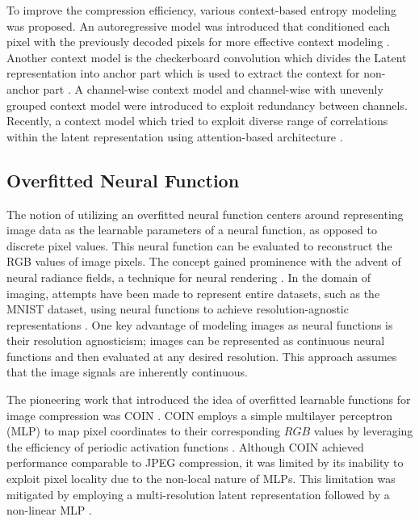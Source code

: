To improve the compression efficiency, various context-based entropy modeling was proposed. An autoregressive model was introduced that conditioned each pixel with the previously decoded pixels for more effective context modeling \cite{minnenJointAutoregressiveHierarchical2018}. Another context model is the checkerboard convolution which divides the Latent representation into anchor part which is used to extract the context for non-anchor part \cite{chengLearnedImageCompression2020}.  A channel-wise context model \cite{liuUnifiedEndtoEndFramework2020} and channel-wise with unevenly grouped context model \cite{heELICEfficientLearned2022} were introduced to exploit redundancy between channels. Recently, a context model which tried to exploit diverse range of correlations within the latent representation using attention-based architecture \cite{jiangMLICMultiReferenceEntropy2024,jiangMLICLinearComplexity2024}. 

\subsection{Overfitted Neural Function}\label{sec:Overfitted_Neural_Function}

The notion of utilizing an overfitted neural function centers around representing image data as the learnable parameters of a neural function, as opposed to discrete pixel values. This neural function can be evaluated to reconstruct the RGB values of image pixels. The concept gained prominence with the advent of neural radiance fields, a technique for neural rendering \cite{mildenhallNeRFRepresentingScenes2020, mullerInstantNeuralGraphics2022, kerbl3DGaussianSplatting2023}. In the domain of imaging, attempts have been made to represent entire datasets, such as the MNIST dataset, using neural functions to achieve resolution-agnostic representations \cite{kimAttentiveNeuralProcesses2019}. One key advantage of modeling images as neural functions is their resolution agnosticism; images can be represented as continuous neural functions and then evaluated at any desired resolution. This approach assumes that the image signals are inherently continuous.

The pioneering work that introduced the idea of overfitted learnable functions for image compression was COIN \cite{dupontCOINCOmpressionImplicit2021}. COIN employs a simple multilayer perceptron (MLP) to map pixel coordinates to their corresponding $RGB$ values by leveraging the efficiency of periodic activation functions \cite{sitzmannImplicitNeuralRepresentations2020}. Although COIN achieved performance comparable to JPEG compression, it was limited by its inability to exploit pixel locality due to the non-local nature of MLPs. This limitation was mitigated by employing a multi-resolution latent representation followed by a non-linear MLP \cite{mullerInstantNeuralGraphics2022}.


